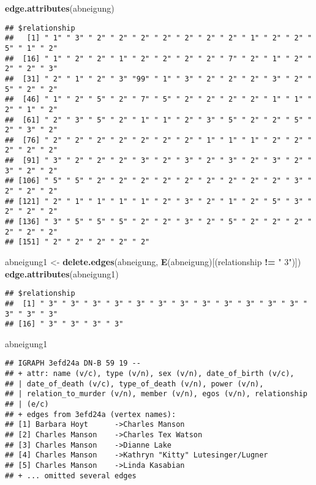 \documentclass[
]{article}
\newenvironment{Shaded}{\begin{snugshade}}{\end{snugshade}}
\newcommand{\KeywordTok}[1]{\textcolor[rgb]{0.13,0.29,0.53}{\textbf{#1}}}
\newcommand{\NormalTok}[1]{#1}
\newcommand{\OperatorTok}[1]{\textcolor[rgb]{0.81,0.36,0.00}{\textbf{#1}}}
\newcommand{\StringTok}[1]{\textcolor[rgb]{0.31,0.60,0.02}{#1}}
\begin{document}
\begin{Shaded}
\begin{Highlighting}[]
\KeywordTok{edge.attributes}\NormalTok{(abneigung)}
\end{Highlighting}
\end{Shaded}

\begin{verbatim}
## $relationship
##   [1] " 1" " 3" " 2" " 2" " 2" " 2" " 2" " 2" " 2" " 1" " 2" " 2" " 5" " 1" " 2"
##  [16] " 1" " 2" " 2" " 1" " 2" " 2" " 2" " 2" " 7" " 2" " 1" " 2" " 2" " 2" " 3"
##  [31] " 2" " 1" " 2" " 3" "99" " 1" " 3" " 2" " 2" " 2" " 3" " 2" " 5" " 2" " 2"
##  [46] " 1" " 2" " 5" " 2" " 7" " 5" " 2" " 2" " 2" " 2" " 1" " 1" " 2" " 1" " 2"
##  [61] " 2" " 3" " 5" " 2" " 1" " 1" " 2" " 3" " 5" " 2" " 2" " 5" " 2" " 3" " 2"
##  [76] " 2" " 2" " 2" " 2" " 2" " 2" " 2" " 1" " 1" " 1" " 2" " 2" " 2" " 2" " 2"
##  [91] " 3" " 2" " 2" " 2" " 3" " 2" " 3" " 2" " 3" " 2" " 3" " 2" " 3" " 2" " 2"
## [106] " 5" " 5" " 2" " 2" " 2" " 2" " 2" " 2" " 2" " 2" " 2" " 3" " 2" " 2" " 2"
## [121] " 2" " 1" " 1" " 1" " 1" " 2" " 3" " 2" " 1" " 2" " 5" " 3" " 2" " 2" " 2"
## [136] " 3" " 5" " 5" " 5" " 2" " 2" " 3" " 2" " 5" " 2" " 2" " 2" " 2" " 2" " 2"
## [151] " 2" " 2" " 2" " 2" " 2"
\end{verbatim}

\begin{Shaded}
\begin{Highlighting}[]
\NormalTok{abneigung1 <-}
\StringTok{  }\KeywordTok{delete.edges}\NormalTok{(abneigung, }\KeywordTok{E}\NormalTok{(abneigung)[(relationship }\OperatorTok{!=}\StringTok{ " 3"}\NormalTok{)])}
\KeywordTok{edge.attributes}\NormalTok{(abneigung1)}
\end{Highlighting}
\end{Shaded}

\begin{verbatim}
## $relationship
##  [1] " 3" " 3" " 3" " 3" " 3" " 3" " 3" " 3" " 3" " 3" " 3" " 3" " 3" " 3" " 3"
## [16] " 3" " 3" " 3" " 3"
\end{verbatim}

\begin{Shaded}
\begin{Highlighting}[]
\NormalTok{abneigung1}
\end{Highlighting}
\end{Shaded}

\begin{verbatim}
## IGRAPH 3efd24a DN-B 59 19 -- 
## + attr: name (v/c), type (v/n), sex (v/n), date_of_birth (v/c),
## | date_of_death (v/c), type_of_death (v/n), power (v/n),
## | relation_to_murder (v/n), member (v/n), egos (v/n), relationship
## | (e/c)
## + edges from 3efd24a (vertex names):
## [1] Barbara Hoyt      ->Charles Manson                   
## [2] Charles Manson    ->Charles Tex Watson               
## [3] Charles Manson    ->Dianne Lake                      
## [4] Charles Manson    ->Kathryn "Kitty" Lutesinger/Lugner
## [5] Charles Manson    ->Linda Kasabian                   
## + ... omitted several edges
\end{verbatim}
\end{document}
